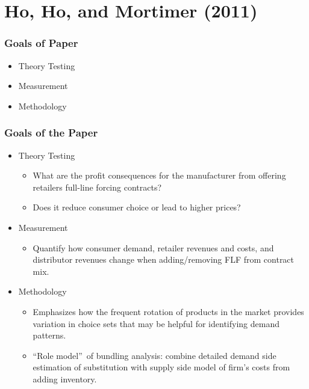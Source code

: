\documentclass[notes=show]{beamer}
\begin{document}

\section{Ho, Ho, and Mortimer (2011)}

\begin{frame}
\frametitle{Goals of Paper}

\begin{itemize}
\item Theory Testing

\item Measurement

\item Methodology
\end{itemize}
\end{frame}


\begin{frame}
\frametitle{Goals of the Paper}

\begin{itemize}
\item Theory Testing

\begin{itemize}
\item What are the profit consequences for the manufacturer from offering
retailers full-line forcing contracts?

\item Does it reduce consumer choice or lead to higher prices?
\end{itemize}

\item Measurement

\begin{itemize}
\item Quantify how consumer demand, retailer revenues and costs, and
distributor revenues change when adding/removing FLF from contract mix.
\end{itemize}

\item Methodology

\begin{itemize}
\item Emphasizes how the frequent rotation of products in the market
provides variation in choice sets that may be helpful for identifying demand
patterns.

\item \textquotedblleft Role model\textquotedblright \ of bundling analysis:
combine detailed demand side estimation of substitution with supply side
model of firm's costs from adding inventory.
\end{itemize}
\end{itemize}
\end{frame}
\end{document}
